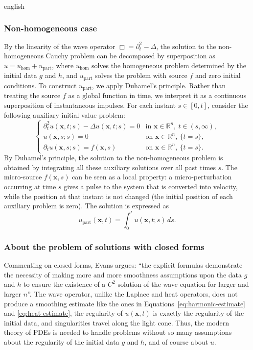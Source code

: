 \documentclass[11pt,letterpaper,twoside,openright]{book} %
\newcommand{\uxt}{u(\mathbf{x},t)}
\begin{document}
\begin{hyphenrules}{english}
\subsubsection{Non-homogeneous case}
By the linearity of the wave operator $\Box=\partial_t^2-\Delta$, the solution to the non-homogeneous
Cauchy problem can be decomposed by superposition as $u=u_{\mathrm{hom}}+u_{\mathrm{part}}$, where
$u_{\mathrm{hom}}$ solves the homogeneous problem determined by the initial data $g$ and $h$, and
$u_{\mathrm{part}}$ solves the problem with source $f$ and zero initial conditions. To construct
$u_{\mathrm{part}}$, we apply Duhamel's principle. Rather than treating the source $f$ as a global
function in time, we interpret it as a continuous superposition of instantaneous impulses. For each
instant $s\in[0,t]$, consider the following auxiliary initial value problem:
\begin{equation}
  \begin{cases}
    \partial_t^2u(\mathbf{x},t;s)-\Delta u(\mathbf{x},t;s)=0 & \text{in } \mathbf{x}\in\mathbb{R}^n,\ t\in(s,\infty),\\
    u(\mathbf{x},s;s)=0 & \text{on } \mathbf{x}\in\mathbb{R}^n,\ \{t=s\},\\
    \partial_t u(\mathbf{x},s;s)=f(\mathbf{x},s) & \text{on } \mathbf{x}\in\mathbb{R}^n,\ \{t=s\}.
  \end{cases}
  \label{eq:wave-duhamel-aux}
\end{equation}
By Duhamel's principle, the solution to the non-homogeneous problem is obtained by integrating all
these auxiliary solutions over all past times $s$. The micro-source $f(\mathbf{x},s)$ can be seen as a local
property: a micro-perturbation occurring at time $s$ gives a pulse to the system that is converted into
velocity, while the position at that instant is not changed (the initial position of each auxiliary
problem is zero). The solution is expressed as
\begin{equation}
  u_{\mathrm{part}}(\mathbf{x},t)=\int_0^t u(\mathbf{x},t;s)\,d s.
  \label{eq:wave-duhamel}
\end{equation}

\subsubsection{About the problem of solutions with closed forms}
Commenting on closed forms, Evans \cite[p.~82]{evans2010} argues: ``the explicit formulas demonstrate the necessity of making more and more smoothness assumptions upon the data $g$ and $h$ to ensure the existence of a $C^2$ solution of the wave equation for larger and larger $n$''. The wave operator, unlike the Laplace
and heat operators, does not produce a smoothing estimate like the ones in
Equations~\eqref{eq:harmonic-estimate} and \eqref{eq:heat-estimate}, the regularity of $\uxt$ is exactly the regularity
of the initial data, and singularities travel along the light cone. Thus, the modern theory of PDEs is needed
to handle problems without so many assumptions about the regularity of the initial data $g$ and $h$,
and of course about $u$.


\end{hyphenrules}
\end{document}
